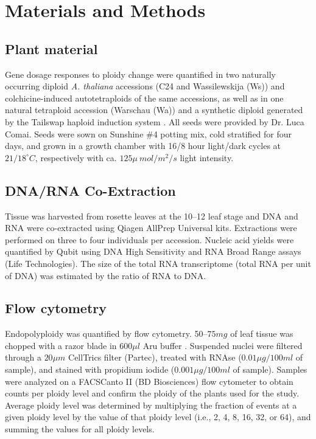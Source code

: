 \documentclass[11pt]{article}
\begin{document}
\section*{Materials and Methods}
\subsection*{Plant material}
Gene dosage responses to ploidy change were quantified in two naturally occurring diploid \textit{A. thaliana} accessions (C24 and Wassilewskija (Ws)) and colchicine-induced autotetraploids of the same accessions, as well as in one natural tetraploid accession (Warschau (Wa)) and a synthetic diploid generated by the Tailswap haploid induction system \citep{ravi2010}.
All seeds were provided by Dr. Luca Comai.
Seeds were sown on Sunshine \#4 potting mix, cold stratified for four days, and grown in a growth chamber with 16/8 hour light/dark cycles at $21/18^{\circ}C$, respectively with ca. $125\mu~mol / m^{2} / s$ light intensity.\\

\subsection*{DNA/RNA Co-Extraction}
Tissue was harvested from rosette leaves at the 10--12 leaf stage and DNA and RNA were co-extracted using Qiagen AllPrep Universal kits.
Extractions were performed on three to four individuals per accession.
Nucleic acid yields were quantified by Qubit using DNA High Sensitivity and RNA Broad Range assays (Life Technologies).
The size of the total RNA transcriptome (total RNA per unit of DNA) was estimated by the ratio of RNA to DNA.\\

\subsection*{Flow cytometry}
Endopolyploidy was quantified by flow cytometry.
50--$75 mg$ of leaf tissue was chopped with a razor blade in $600 \mu l$ Aru buffer \citep{arumuganathan1991}.
Suspended nuclei were filtered through a $20 \mu m$ CellTrics filter (Partec), treated with RNAse ($0.01\mu g/100ml$ of sample), and stained with propidium iodide ($0.001\mu g/100ml$ of sample).
Samples were analyzed on a FACSCanto II (BD Biosciences) flow cytometer to obtain counts per ploidy level and confirm the ploidy of the plants used for the study.
Average ploidy level was determined by multiplying the fraction of events at a given ploidy level by the value of that ploidy level (i.e., 2, 4, 8, 16, 32, or 64), and summing the values for all ploidy levels.\\
\end{document}
